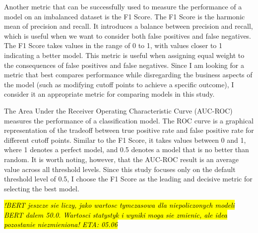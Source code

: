 Another metric that can be successfully used to measure the performance of a model on an imbalanced dataset is the F1 Score. The F1 Score is the harmonic mean of precision and recall. It introduces a balance between precision and recall, which is useful when we want to consider both false positives and false negatives. The F1 Score takes values in the range of 0 to 1, with values closer to 1 indicating a better model. This metric is useful when assigning equal weight to the consequences of false positives and false negatives. Since I am looking for a metric that best compares performance while disregarding the business aspects of the model (such as modifying cutoff points to achieve a specific outcome), I consider it an appropriate metric for comparing models in this study.

The Area Under the Receiver Operating Characteristic Curve (AUC-ROC) measures the performance of a classification model. The ROC curve is a graphical representation of the tradeoff between true positive rate and false positive rate for different cutoff points. Similar to the F1 Score, it takes values between 0 and 1, where 1 denotes a perfect model, and 0.5 denotes a model that is no better than random. It is worth noting, however, that the AUC-ROC result is an average value across all threshold levels. Since this study focuses only on the default threshold level of 0.5, I choose the F1 Score as the leading and decisive metric for selecting the best model.

\hl{\textit{!BERT jeszcze sie liczy, jako wartosc tymczasowa dla niepoliczonych modeli BERT dalem 50.0. Wartosci statystyk i wyniki moga sie zmienic, ale idea pozostanie niezmieniona! ETA: 05.06}}

